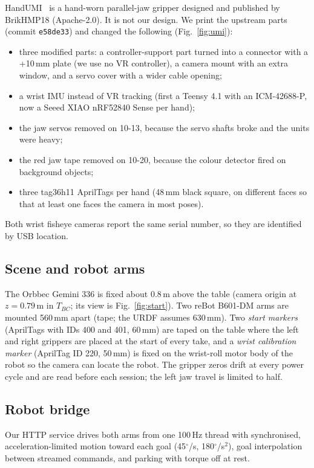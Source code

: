 \documentclass[conference,10pt]{IEEEtran}
\newcommand{\mm}{\,mm\xspace}
\begin{document}
HandUMI~\cite{handumi,meza2026handumi} is a hand-worn parallel-jaw gripper designed and published by BrikHMP18
(Apache-2.0). It is not our design. We print the upstream parts (commit \texttt{e58de33}) and changed the following
(Fig.~\ref{fig:umi}):
\begin{itemize}
\item three modified parts: a controller-support part turned into a connector with a +10\mm plate (we use no VR
  controller), a camera mount with an extra window, and a servo cover with a wider cable opening;
\item a wrist IMU instead of VR tracking (first a Teensy 4.1 with an ICM-42688-P, now a Seeed XIAO nRF52840 Sense per hand);
\item the jaw servos removed on 10-13, because the servo shafts broke and the units were heavy;
\item the red jaw tape removed on 10-20, because the colour detector fired on background objects;
\item three tag36h11 AprilTags per hand (48\mm black square, on different faces so that at least one faces the camera in
  most poses).
\end{itemize}
Both wrist fisheye cameras report the same serial number, so they are identified by USB location.

\subsection{Scene and robot arms}


The Orbbec Gemini 336 is fixed about 0.8\,m above the table (camera origin at $z=0.79$\,m in $T_{BC}$; its view is Fig.~\ref{fig:start}). Two reBot B601-DM arms are mounted
560\mm apart (tape; the URDF assumes 630\mm). Two \emph{start markers} (AprilTags with IDs 400 and 401, 60\mm) are taped on the table where the left and right
grippers are placed at the start of every take, and a \emph{wrist calibration marker} (AprilTag ID 220, 50\mm) is fixed
on the wrist-roll motor body of the robot so the camera can locate the robot. The gripper zeros drift at every power cycle and are
read before each session; the left jaw travel is limited to half.

\subsection{Robot bridge}\label{sec:bridge}
Our HTTP service drives both arms from one 100\,Hz thread with synchronised, acceleration-limited motion toward each goal
(45$^\circ$/s, 180$^\circ$/s$^2$), goal interpolation between streamed commands, and parking with torque off at rest.
\end{document}
